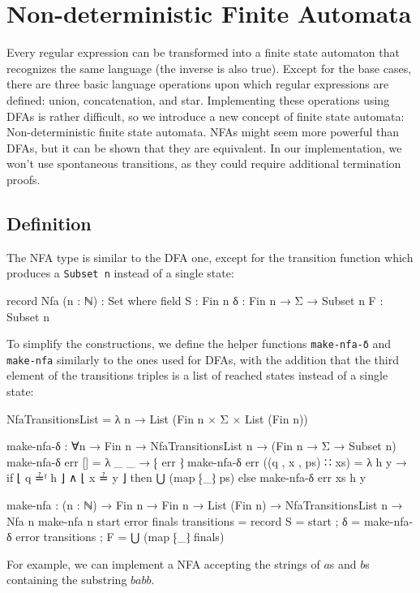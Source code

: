 \section{Non-deterministic Finite Automata}
Every regular expression can be transformed into a finite state automaton that recognizes the same language (the inverse is also true). Except for the base cases, there are three basic language operations upon which regular expressions are defined: union, concatenation, and star. Implementing these operations using DFAs is rather difficult, so we introduce a new concept of finite state automata: Non-deterministic finite state automata. NFAs might seem more powerful than DFAs, but it can be shown that they are equivalent. In our implementation, we won't use spontaneous transitions, as they could require additional termination proofs.

\subsection{Definition}
The NFA type is similar to the DFA one, except for the transition function which produces a \texttt{Subset n} instead of a single state:
\begin{agda}
record Nfa (n : ℕ) : Set where
  field
    S : Fin n
    δ : Fin n → Σ → Subset n
    F : Subset n
\end{agda}
To simplify the constructions, we define the helper functions \texttt{make-nfa-δ} and \texttt{make-nfa} similarly to the ones used for DFAs, with the addition that the third element of the transitions triples is a list of reached states instead of a single state:
\begin{agda}
NfaTransitionsList = λ n → List (Fin n × Σ × List (Fin n))

make-nfa-δ : ∀{n}
  → Fin n
  → NfaTransitionsList n
  → (Fin n → Σ → Subset n)
make-nfa-δ err [] = λ _ _ → ⁅ err ⁆
make-nfa-δ err ((q , x , ps) ∷ xs)
  = λ h y → if ⌊ q ≟ᶠ h ⌋ ∧ ⌊ x ≟ y ⌋
            then ⋃ (map ⁅_⁆ ps)
            else make-nfa-δ err xs h y

make-nfa : (n : ℕ)
  → Fin n
  → Fin n
  → List (Fin n)
  → NfaTransitionsList n
  → Nfa n
make-nfa n start error finals transitions
  = record
    { S = start
    ; δ = make-nfa-δ error transitions
    ; F = ⋃ (map ⁅_⁆ finals)
    }
\end{agda}
For example, we can implement a NFA accepting the strings of $a$s and $b$s containing the substring $babb$. 

